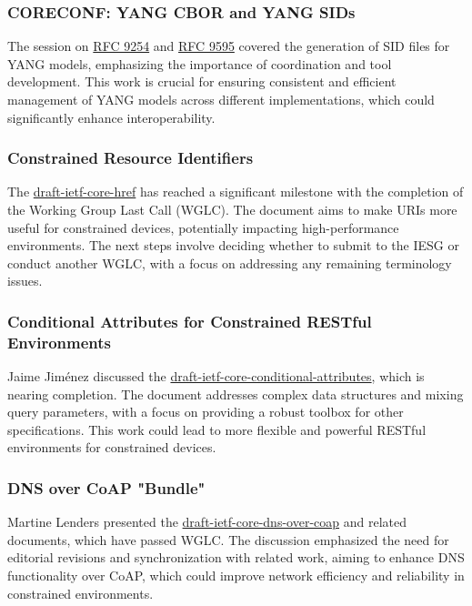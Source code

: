 \documentclass{article}
\begin{document}
\subsubsection{CORECONF: YANG CBOR and YANG SIDs}
The session on \href{https://datatracker.ietf.org/doc/rfc9254/}{RFC 9254} and \href{https://datatracker.ietf.org/doc/rfc9595/}{RFC 9595} covered the generation of SID files for YANG models, emphasizing the importance of coordination and tool development. This work is crucial for ensuring consistent and efficient management of YANG models across different implementations, which could significantly enhance interoperability.

\subsubsection{Constrained Resource Identifiers}
The \href{https://datatracker.ietf.org/doc/draft-ietf-core-href/}{draft-ietf-core-href} has reached a significant milestone with the completion of the Working Group Last Call (WGLC). The document aims to make URIs more useful for constrained devices, potentially impacting high-performance environments. The next steps involve deciding whether to submit to the IESG or conduct another WGLC, with a focus on addressing any remaining terminology issues.

\subsubsection{Conditional Attributes for Constrained RESTful Environments}
Jaime Jiménez discussed the \href{https://datatracker.ietf.org/doc/draft-ietf-core-conditional-attributes/}{draft-ietf-core-conditional-attributes}, which is nearing completion. The document addresses complex data structures and mixing query parameters, with a focus on providing a robust toolbox for other specifications. This work could lead to more flexible and powerful RESTful environments for constrained devices.

\subsubsection{DNS over CoAP "Bundle"}
Martine Lenders presented the \href{https://datatracker.ietf.org/doc/draft-ietf-core-dns-over-coap/}{draft-ietf-core-dns-over-coap} and related documents, which have passed WGLC. The discussion emphasized the need for editorial revisions and synchronization with related work, aiming to enhance DNS functionality over CoAP, which could improve network efficiency and reliability in constrained environments.
\end{document}
